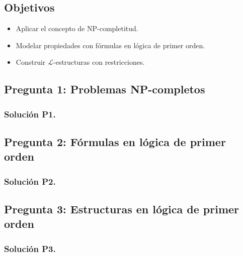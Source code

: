 \documentclass{article}
\newcommand{\cL}{\mathcal{L}}
\begin{document}
\subsection*{Objetivos}
\begin{itemize}
    \item Aplicar el concepto de NP-completitud.
    \item Modelar propiedades con fórmulas en lógica de primer orden.
    \item Construir $\cL$-estructuras con restricciones.
\end{itemize}

\subsection*{Pregunta 1: Problemas NP-completos}

\subsubsection*{Solución P1.}

\newpage

\subsection*{Pregunta 2: Fórmulas en lógica de primer orden}

\subsubsection*{Solución P2.}

\newpage

\subsection*{Pregunta 3: Estructuras en lógica de primer orden}

\subsubsection*{Solución P3.}

\end{document}
